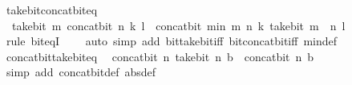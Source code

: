 \begin{isabellebody}
%
\isadelimproof
\isanewline
%
\endisadelimproof
\isanewline
{}\isamarkupfalse%
\ take{\isacharunderscore}{\kern0pt}bit{\isacharunderscore}{\kern0pt}concat{\isacharunderscore}{\kern0pt}bit{\isacharunderscore}{\kern0pt}eq{\isacharcolon}{\kern0pt}\isanewline
\ \ {\isacartoucheopen}take{\isacharunderscore}{\kern0pt}bit\ m\ {\isacharparenleft}{\kern0pt}concat{\isacharunderscore}{\kern0pt}bit\ n\ k\ l{\isacharparenright}{\kern0pt}\ {\isacharequal}{\kern0pt}\ concat{\isacharunderscore}{\kern0pt}bit\ {\isacharparenleft}{\kern0pt}min\ m\ n{\isacharparenright}{\kern0pt}\ k\ {\isacharparenleft}{\kern0pt}take{\isacharunderscore}{\kern0pt}bit\ {\isacharparenleft}{\kern0pt}m\ {\isacharminus}{\kern0pt}\ n{\isacharparenright}{\kern0pt}\ l{\isacharparenright}{\kern0pt}{\isacartoucheclose}\isanewline
%
\isadelimproof
\ \ %
\endisadelimproof
%
\isatagproof
{}\isamarkupfalse%
\ {\isacharparenleft}{\kern0pt}rule\ bit{\isacharunderscore}{\kern0pt}eqI{\isacharparenright}{\kern0pt}\isanewline
\ \ \ \ {\isacharparenleft}{\kern0pt}auto\ simp\ add{\isacharcolon}{\kern0pt}\ bit{\isacharunderscore}{\kern0pt}take{\isacharunderscore}{\kern0pt}bit{\isacharunderscore}{\kern0pt}iff\ bit{\isacharunderscore}{\kern0pt}concat{\isacharunderscore}{\kern0pt}bit{\isacharunderscore}{\kern0pt}iff\ min{\isacharunderscore}{\kern0pt}def{\isacharparenright}{\kern0pt}%
\endisatagproof
{\isafoldproof}%
%
\isadelimproof
\ \ \isanewline
%
\endisadelimproof
\isanewline
{}\isamarkupfalse%
\ concat{\isacharunderscore}{\kern0pt}bit{\isacharunderscore}{\kern0pt}take{\isacharunderscore}{\kern0pt}bit{\isacharunderscore}{\kern0pt}eq{\isacharcolon}{\kern0pt}\isanewline
\ \ {\isacartoucheopen}concat{\isacharunderscore}{\kern0pt}bit\ n\ {\isacharparenleft}{\kern0pt}take{\isacharunderscore}{\kern0pt}bit\ n\ b{\isacharparenright}{\kern0pt}\ {\isacharequal}{\kern0pt}\ concat{\isacharunderscore}{\kern0pt}bit\ n\ b{\isacartoucheclose}\isanewline
%
\isadelimproof
\ \ %
\endisadelimproof
%
\isatagproof
{}\isamarkupfalse%
\ {\isacharparenleft}{\kern0pt}simp\ add{\isacharcolon}{\kern0pt}\ concat{\isacharunderscore}{\kern0pt}bit{\isacharunderscore}{\kern0pt}def\ {\isacharbrackleft}{\kern0pt}abs{\isacharunderscore}{\kern0pt}def{\isacharbrackright}{\kern0pt}{\isacharparenright}{\kern0pt}%
\endisatagproof
{\isafoldproof}%
%
\isadelimproof
%
\endisadelimproof
%
\isadelimdocument
%
\endisadelimdocument
%
\isatagdocument
%
\isamarkuptrue%
%
\endisatagdocument
{\isafolddocument}%
%
\isadelimdocument
%
\endisadelimdocument

\end{isabellebody}
